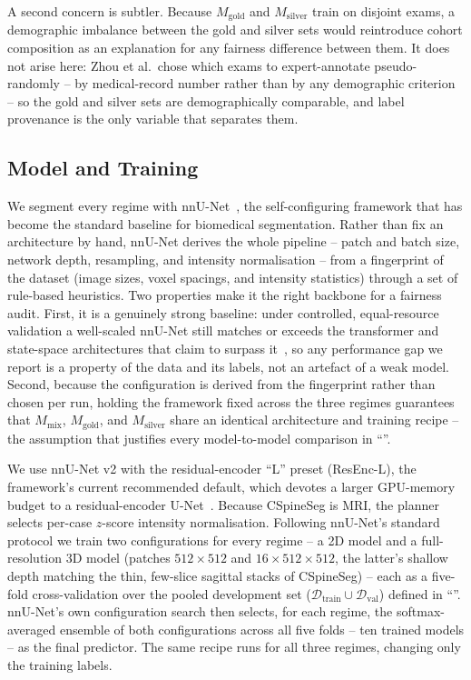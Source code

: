 A second concern is subtler. Because $M_{\mathrm{gold}}$ and $M_{\mathrm{silver}}$
train on disjoint exams, a demographic imbalance between the gold and silver sets
would reintroduce cohort composition as an explanation for any fairness difference
between them. It does not arise here: Zhou et al.~chose which exams to
expert-annotate pseudo-randomly -- by medical-record number rather than by any
demographic criterion~\cite{zhou2025cspineseg} -- so the gold and silver sets are
demographically comparable, and label provenance is the only variable that
separates them.

\subsection{Model and Training}
\label{sec:model}

We segment every regime with nnU-Net~\cite{isensee2021nnunet}, the self-configuring
framework that has become the standard baseline for biomedical segmentation. Rather
than fix an architecture by hand, nnU-Net derives the whole pipeline -- patch and
batch size, network depth, resampling, and intensity normalisation -- from a
fingerprint of the dataset (image sizes, voxel spacings, and intensity
statistics) through a set of rule-based heuristics. Two properties make it the right
backbone for a fairness audit. First, it is a genuinely strong baseline: under
controlled, equal-resource validation a well-scaled nnU-Net still matches or exceeds
the transformer and state-space architectures that claim to surpass
it~\cite{isensee2024revisited}, so any performance gap we report is a property of the
data and its labels, not an artefact of a weak model. Second, because the
configuration is derived from the fingerprint rather than chosen per run,
holding the framework fixed across the three regimes guarantees that
$M_{\mathrm{mix}}$, $M_{\mathrm{gold}}$, and $M_{\mathrm{silver}}$ share an identical
architecture and training recipe -- the assumption that justifies every model-to-model
comparison in ``''.

We use nnU-Net v2 with the residual-encoder ``L'' preset (ResEnc-L), the framework's
current recommended default, which devotes a larger GPU-memory budget to a
residual-encoder U-Net~\cite{isensee2024revisited}. Because CSpineSeg is MRI, the planner
selects per-case $z$-score intensity normalisation. Following nnU-Net's standard protocol
we train two configurations for every regime -- a 2D model and a full-resolution 3D model
(patches $512\times512$ and $16\times512\times512$, the latter's shallow depth matching
the thin, few-slice sagittal stacks of CSpineSeg) -- each as a five-fold
cross-validation over the pooled development set
($\mathcal{D}_{\mathrm{train}}\cup\mathcal{D}_{\mathrm{val}}$) defined in
``''. nnU-Net's own
configuration search then selects, for each regime, the softmax-averaged ensemble of
both configurations across all five folds -- ten trained models -- as the final
predictor. The same recipe runs for all three regimes, changing only the training
labels.

